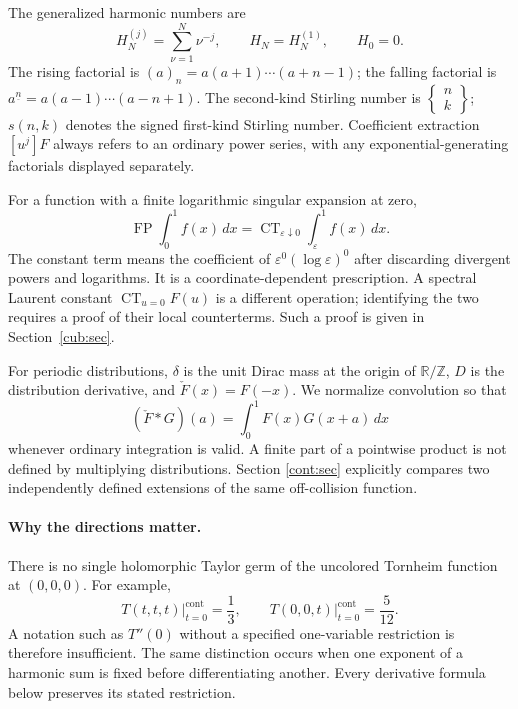 \documentclass[11pt,a4paper]{article}
\theoremstyle{definition}
\theoremstyle{remark}
\DeclareMathOperator*{\FP}{FP}
\DeclareMathOperator{\CT}{CT}
\numberwithin{equation}{section}
\begin{document}
The generalized harmonic numbers are
\[
 H_N^{(j)}=\sum_{\nu=1}^N\nu^{-j},\qquad H_N=H_N^{(1)},\qquad H_0=0.
\]
The rising factorial is $(a)_n=a(a+1)\cdots(a+n-1)$; the falling
factorial is $a^{\underline n}=a(a-1)\cdots(a-n+1)$.
The second-kind Stirling number is
$\left\{\begin{smallmatrix}n\\k\end{smallmatrix}\right\}$;
$s(n,k)$ denotes the signed first-kind Stirling number.
Coefficient extraction $[u^j]F$ always refers to an ordinary power
series, with any exponential-generating factorials displayed
separately.

For a function with a finite logarithmic singular expansion at zero,
\begin{equation}\label{scope:FP}
 \FP\int_0^1 f(x)\,dx
   =\CT_{\varepsilon\downarrow0}\int_\varepsilon^1 f(x)\,dx.
\end{equation}
The constant term means the coefficient of
$\varepsilon^0(\log\varepsilon)^0$ after discarding divergent powers
and logarithms. It is a coordinate-dependent prescription. A spectral
Laurent constant $\CT_{u=0}F(u)$ is a different operation; identifying
the two requires a proof of their local counterterms. Such a proof is
given in Section~\ref{cub:sec}.

For periodic distributions, $\delta$ is the unit Dirac mass at the
origin of $\mathbb R/\mathbb Z$, $D$ is the distribution derivative,
and $\check F(x)=F(-x)$. We normalize convolution so that
\[
 (\check F*G)(a)=\int_0^1 F(x)G(x+a)\,dx
\]
whenever ordinary integration is valid. A finite part of a pointwise
product is not defined by multiplying distributions. Section
\ref{cont:sec} explicitly compares two independently defined
extensions of the same off-collision function.

\paragraph{Why the directions matter.}
There is no single holomorphic Taylor germ of the uncolored Tornheim
function at $(0,0,0)$. For example,
\[
 T(t,t,t)\big|_{t=0}^{\mathrm{cont}}=\frac13,\qquad
 T(0,0,t)\big|_{t=0}^{\mathrm{cont}}=\frac5{12}.
\]
A notation such as $T''(0)$ without a specified one-variable
restriction is therefore insufficient. The same distinction occurs
when one exponent of a harmonic sum is fixed before differentiating
another. Every derivative formula below preserves its stated
restriction.

\end{document}
